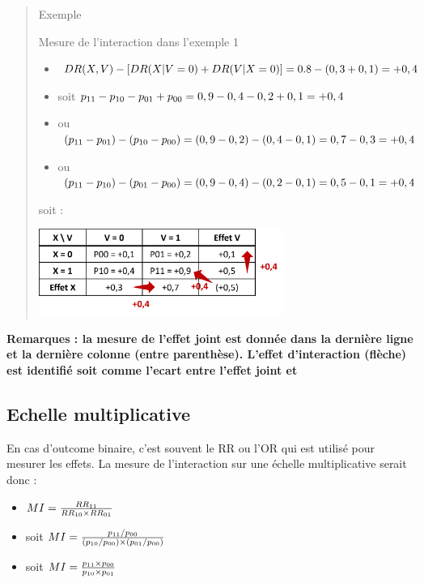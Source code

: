 \documentclass[
]{book}
\providecommand{\tightlist}{%
  \setlength{\itemsep}{0pt}\setlength{\parskip}{0pt}}
\begin{document}
\begin{quote}
Exemple

Mesure de l'interaction dans l'exemple 1

\begin{itemize}
\tightlist
\item
  \(\small DR(X, V) - [DR(X|V=0) + DR(V|X=0)] = 0.8 - (0,3 + 0,1) = +0,4\)
\item
  soit \(\small p_{11} - p_{10} - p_{01} + p_{00} = 0,9 - 0,4 - 0,2 + 0,1 = +0,4\)
\item
  ou \(\small (p_{11} - p_{01}) - (p_{10} - p_{00}) = (0,9 - 0,2) - (0,4 - 0,1) = 0,7 - 0,3 = +0,4\)
\item
  ou \(\small (p_{11} - p_{10}) - (p_{01} - p_{00}) = (0,9 - 0,4) - (0,2 - 0,1) = 0,5 - 0,1 = +0,4\)
\end{itemize}

soit :

\includegraphics[width=0.65\textwidth,height=\textheight]{img/Image2.png}
\end{quote}

\textbf{Remarques : la mesure de l'effet joint est donnée dans la dernière ligne et la dernière colonne (entre parenthèse). L'effet d'interaction (flèche) est identifié soit comme l'ecart entre l'effet joint et }

\hypertarget{echelle-multiplicative}{%
\subsection*{Echelle multiplicative}\label{echelle-multiplicative}}

En cas d'outcome binaire, c'est souvent le RR ou l'OR qui est utilisé pour mesurer les effets. La mesure de l'interaction sur une échelle multiplicative serait donc \citet{vanderweele_tutorial_2014} :

\begin{itemize}
\tightlist
\item
  \(\small MI = \frac{RR_{11}}{RR_{10} \times RR_{01}}\)
\item
  soit \(\small MI = \frac{p_{11} / p_{00}}{(p_{10} / p_{00}) \times (p_{01} / p_{00})}\)
\item
  soit \(\small MI = \frac{p_{11} \times p_{00}}{p_{10} \times p_{01}}\)
\end{itemize}
\end{document}
